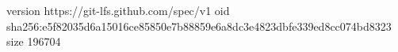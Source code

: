 version https://git-lfs.github.com/spec/v1
oid sha256:e5f82035d6a15016ce85850e7b88859e6a8dc3e4823dbfe339ed8cc074bd8323
size 196704
